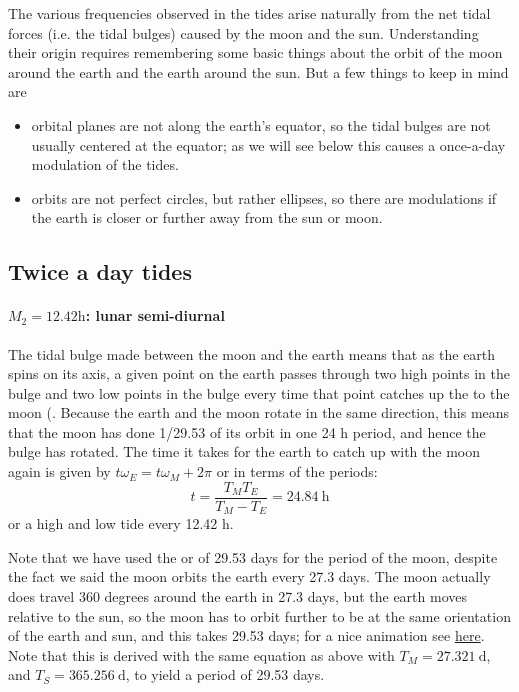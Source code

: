 The various frequencies observed in the tides arise naturally from the net tidal forces (i.e. the tidal bulges) caused by the moon and the sun.  Understanding their origin requires remembering some basic things about the orbit of the moon around the earth and the earth around the sun.  But a few things to keep in mind are
\begin{itemize}
  \item orbital planes are not along the earth's equator, so the tidal bulges are not usually centered at the equator; as we will see below this causes a once-a-day modulation of the tides.  
  \item orbits are not perfect circles, but rather ellipses, so there are modulations if the earth is closer or further away from the sun or moon. 
\end{itemize}

\subsection{Twice a day tides}

\paragraph{$M_2 = 12.42 \mathrm{h}$: lunar semi-diurnal} The tidal bulge made between the moon and the earth means that as the earth spins on its axis, a given point on the earth passes through two high points in the bulge and two low points in the bulge every time that point catches up the to the moon (. Because the earth and the moon rotate in the same direction, this means that the moon has done 1/29.53 of its orbit in one 24 h period, and hence the bulge has rotated.  The time it takes for the earth to catch up with the moon again is given by $t\omega_{E} = t\omega_M + 2\pi$ or in terms of the periods: 
\begin{equation}
  t = \frac{T_M T_E}{T_M - T_E} = 24.84\ \mathrm{h}
\end{equation}
or a high and low tide every 12.42 h. 

Note that we have used the  or  of 29.53 days for the period of the moon, despite the fact we said the moon orbits the earth every 27.3 days.  The moon actually does travel 360 degrees around the earth in 27.3 days, but the earth moves relative to the sun, so the moon has to orbit further to be at the same orientation of the earth and sun, and this takes 29.53 days; for a nice animation see \href{http://www.sumanasinc.com/webcontent/animations/content/sidereal.html}{here}. Note that this is derived with the same equation as above with $T_M = 27.321 \ \mathrm{d}$, and $T_S=365.256\ \mathrm{d}$, to yield a period of 29.53 days.  


